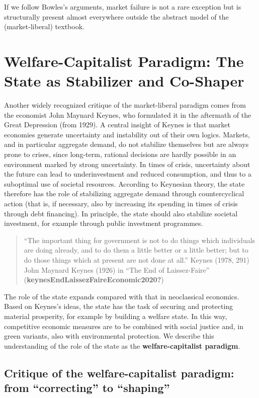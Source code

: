 \documentclass[
  british,
  a4paper,
  DIV=11,
  numbers=noendperiod,
  oneside,
  openany]{scrreprt}
\begin{document}
If we follow Bowles's arguments, market failure is not a rare exception
but is structurally present almost everywhere outside the abstract model
of the (market-liberal) textbook.

\section{Welfare-Capitalist Paradigm: The State as Stabilizer and
Co-Shaper}\label{welfare-capitalist-paradigm-the-state-as-stabilizer-and-co-shaper}

Another widely recognized critique of the market-liberal paradigm comes
from the economist John Maynard Keynes, who formulated it in the
aftermath of the Great Depression (from 1929). A central insight of
Keynes is that market economies generate uncertainty and instability out
of their own logics. Markets, and in particular aggregate demand, do not
stabilize themselves but are always prone to crises, since long-term,
rational decisions are hardly possible in an environment marked by
strong uncertainty. In times of crisis, uncertainty about the future can
lead to underinvestment and reduced consumption, and thus to a
suboptimal use of societal resources. According to Keynesian theory, the
state therefore has the role of stabilizing aggregate demand through
countercyclical action (that is, if necessary, also by increasing its
spending in times of crisis through debt financing). In principle, the
state should also stabilize societal investment, for example through
public investment programmes.

\begin{quote}
``The important thing for government is not to do things which
individuals are doing already, and to do them a little better or a
little better; but to do those things which at present are not done at
all.'' Keynes (1978, 291) John Maynard Keynes (1926) in ``The End of
Laissez-Faire'' (\textbf{keynesEndLaissezFaireEconomic2020?})
\end{quote}

The role of the state expands compared with that in neoclassical
economics. Based on Keynes's ideas, the state has the task of securing
and protecting material prosperity, for example by building a welfare
state. In this way, competitive economic measures are to be combined
with social justice and, in green variants, also with environmental
protection. We describe this understanding of the role of the state as
the \textbf{welfare-capitalist paradigm}.

\subsection{Critique of the welfare-capitalist paradigm: from
``correcting'' to
``shaping''}\label{critique-of-the-welfare-capitalist-paradigm-from-correcting-to-shaping}
\end{document}
